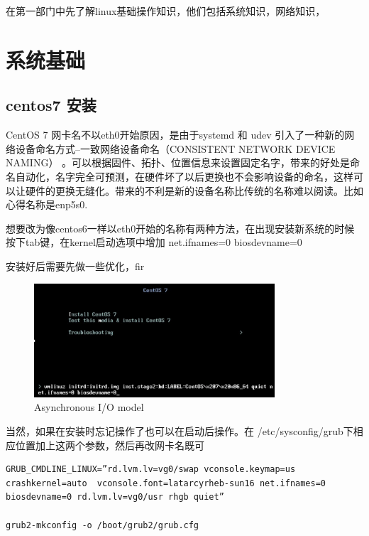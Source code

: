 

在第一部门中先了解linux基础操作知识，他们包括系统知识，网络知识，


\chapter{系统基础}

\section{centos7 安装}

CentOS 7 网卡名不以eth0开始原因，是由于systemd 和 udev 引入了一种新的网络设备命名方式–一致网络设备命名（CONSISTENT NETWORK DEVICE NAMING） 。可以根据固件、拓扑、位置信息来设置固定名字，带来的好处是命名自动化，名字完全可预测，在硬件坏了以后更换也不会影响设备的命名，这样可以让硬件的更换无缝化。带来的不利是新的设备名称比传统的名称难以阅读。比如心得名称是enp5s0.

想要改为像centos6一样以eth0开始的名称有两种方法，在出现安装新系统的时候按下tab键，在kernel启动选项中增加 net.ifnames=0 biosdevname=0 

安装好后需要先做一些优化，fir

\begin{figure}[!ht]
    \centering    
    \includegraphics[width=0.8\textwidth]{linuxBasic/images/centos-bios.png}
    \caption{\label{Fig:async} Asynchronous I/O model}
\end{figure}

当然，如果在安装时忘记操作了也可以在启动后操作。在 /etc/sysconfig/grub下相应位置加上这两个参数，然后再改网卡名既可

\begin{lstlisting}
GRUB_CMDLINE_LINUX=”rd.lvm.lv=vg0/swap vconsole.keymap=us crashkernel=auto  vconsole.font=latarcyrheb-sun16 net.ifnames=0 biosdevname=0 rd.lvm.lv=vg0/usr rhgb quiet”

grub2-mkconfig -o /boot/grub2/grub.cfg

\end{lstlisting}

